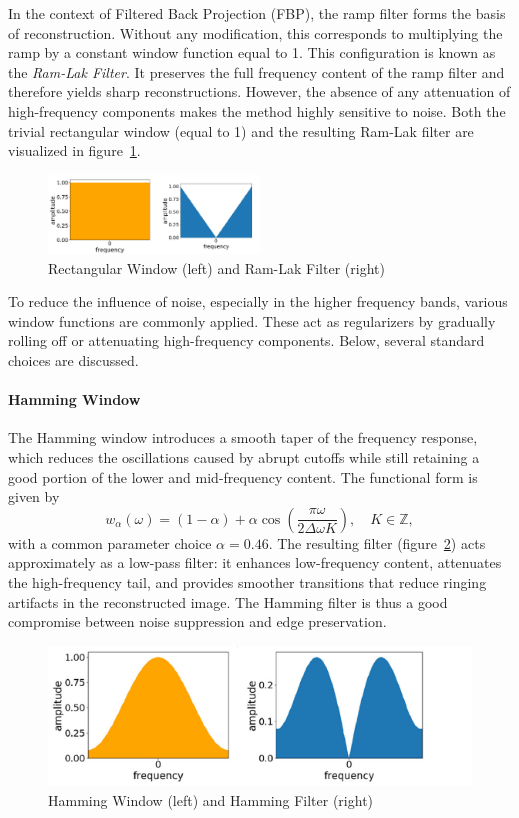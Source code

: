 \documentclass[12pt,a4paper]{article}
\begin{document}
In the context of Filtered Back Projection (FBP), the ramp filter forms the basis of reconstruction. Without any modification, this corresponds to multiplying the ramp by a constant window function equal to 1. This configuration is known as the \emph{Ram-Lak Filter}. It preserves the full frequency content of the ramp filter and therefore yields sharp reconstructions. However, the absence of any attenuation of high-frequency components makes the method highly sensitive to noise. Both the trivial rectangular window (equal to 1) and the resulting Ram-Lak filter are visualized in figure~\ref{fig6}.

\begin{figure}[h!]
    \centering
    \includegraphics[width=0.5\textwidth]{Bachelorthesis/UsedImages/fig6.png}
    \caption{Rectangular Window (left) and Ram-Lak Filter (right)}
    \label{fig6}
\end{figure}
To reduce the influence of noise, especially in the higher frequency bands, various window functions are commonly applied. These act as regularizers by gradually rolling off or attenuating high-frequency components. Below, several standard choices are discussed.

\paragraph{Hamming Window}
The Hamming window introduces a smooth taper of the frequency response, which reduces the oscillations caused by abrupt cutoffs while still retaining a good portion of the lower and mid-frequency content. The functional form is given by
\[
w_\alpha(\omega) = (1-\alpha) + \alpha \cos\left(\frac{\pi \omega}{2 \Delta \omega K}\right), 
\quad K \in \mathbb Z,
\]
with a common parameter choice $\alpha = 0.46$. The resulting filter (figure~\ref{fig7}) acts approximately as a low-pass filter: it enhances low-frequency content, attenuates the high-frequency tail, and provides smoother transitions that reduce ringing artifacts in the reconstructed image. The Hamming filter is thus a good compromise between noise suppression and edge preservation.

\begin{figure}[h!]
    \centering
    \includegraphics[width=0.5\linewidth]{Bachelorthesis//UsedImages/fig7.png}
    \caption{Hamming Window (left) and Hamming Filter (right)}
    \label{fig7}
\end{figure}
\end{document}
